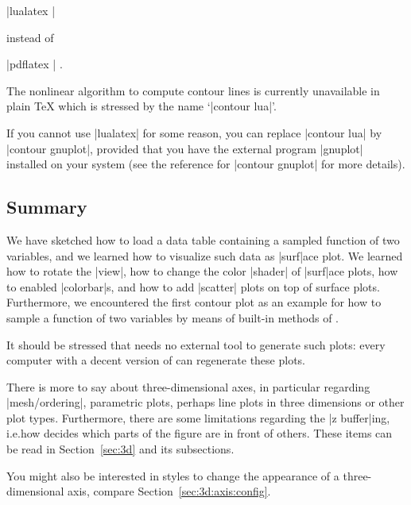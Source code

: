 |lualatex |

\noindent instead of

|pdflatex | .

\noindent
The nonlinear algorithm to
compute contour lines is currently unavailable in plain \TeX{} which is stressed
by the name `|contour lua|'.


If you cannot use |lualatex| for some reason, you can replace |contour lua| by |contour gnuplot|, provided that you have the external program |gnuplot| installed on your system (see the reference for |contour gnuplot| for more details).

\subsection{Summary}

We have sketched how to load a data table containing a sampled function of two
variables, and we learned how to visualize such data as |surf|ace plot. We
learned how to rotate the |view|, how to change the color |shader| of |surf|ace
plots, how to enabled |colorbar|s, and how to add |scatter| plots on top of
surface plots. Furthermore, we encountered the first contour plot as an example
for how to sample a function of two variables by means of built-in methods of
\PGFPlots{}.

It should be stressed that \PGFPlots{} needs no external tool to generate such
plots: every computer with a decent version of \PGFPlots{} can regenerate these plots.

There is more to say about three-dimensional axes, in particular regarding
|mesh/ordering|, parametric plots, perhaps line plots in three dimensions or
other plot types. Furthermore, there are some limitations regarding the
|z buffer|ing, i.e.\@ how \PGFPlots{} decides which parts of the figure are in
front of others. These items can be read in Section~\ref{sec:3d} and its
subsections.

You might also be interested in styles to change the appearance of a
three-dimensional axis, compare Section~\ref{sec:3d:axis:config}.
